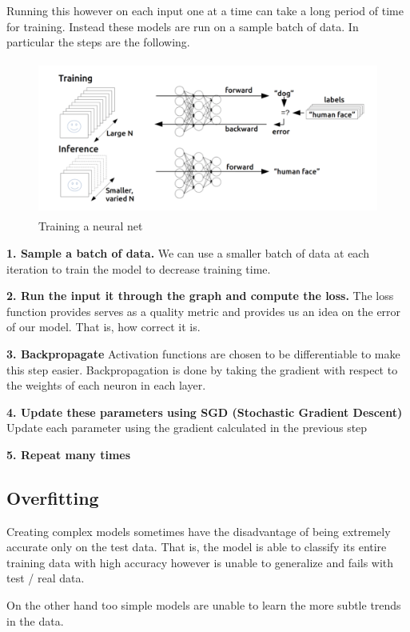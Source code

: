 \documentclass[twoside]{article}
\begin{document}
Running this however on each input one at a time can take a long period of time for training. Instead these models are run on a sample batch of data. In particular the steps are the following.\\ 

\begin{figure}[!htb]
\centering
\includegraphics[height = 2in]{pics/training_net.png}
\caption{Training a neural net\cite{}}
\label{fig:Training a neural net}
\end{figure}

\textbf{1. Sample a batch of data.}
We can use a smaller batch of data at each iteration to train the model to decrease training time.

\textbf{2. Run the input it through the graph and compute the loss.} 
The loss function provides serves as a quality metric and provides us an idea on the error of our model. That is, how correct it is.

\textbf{3. Backpropagate} 
Activation functions are chosen to be differentiable to make this step easier. Backpropagation is done by taking the gradient with respect to the weights of each neuron in each layer. 

\textbf{4. Update these parameters using SGD (Stochastic Gradient Descent)}
Update each parameter using the gradient calculated in the previous step

\textbf{5. Repeat many times}

\subsection{Overfitting}
Creating complex models sometimes have the disadvantage of being extremely accurate only on the test data. That is, the model is able to classify its entire training data with high accuracy however is unable to generalize and fails with test / real data. 

On the other hand too simple models are unable to learn the more subtle trends in the data. 
\end{document}
